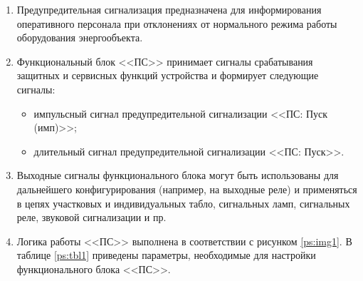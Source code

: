 \documentclass[a4paper, 12pt,table, hidelinks, DIV=calc]{extarticle} %
\begin{document}
\begin{enumerate}[label=\arabic{section}.\arabic{subsection}.\arabic*, labelsep=4pt, leftmargin=0pt, itemindent=57pt]

\item	
Предупредительная сигнализация предназначена для информирования оперативного персонала при отклонениях от нормального режима работы оборудования энергообъекта.

\item
Функциональный блок <<ПС>> принимает сигналы срабатывания защитных и сервисных функций устройства и формирует следующие сигналы:
\begin{itemize}
	\item импульсный сигнал предупредительной сигнализации <<ПС: Пуск (имп)>>;
	\item длительный сигнал предупредительной сигнализации <<ПС: Пуск>>.
\end{itemize}

\item
Выходные сигналы функционального блока могут быть использованы для дальнейшего конфигурирования (например, на выходные реле) и применяться в цепях участковых и индивидуальных табло, сигнальных ламп, сигнальных реле, звуковой сигнализации и пр.
\item
Логика работы <<ПС>> выполнена в соответствии с рисунком \ref{ps:img1}. В таблице \ref{ps:tbl1} приведены параметры, необходимые для настройки функционального блока <<ПС>>. 


\end{enumerate}
\end{document}
